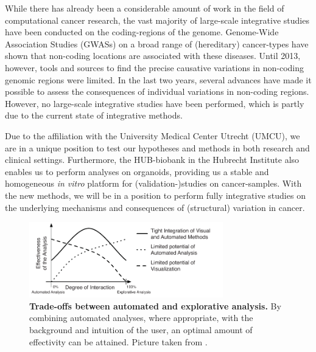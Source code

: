 \documentclass[twoside,fontsize=10pt]{article}
\begin{document}
\noindent
While there has already been a considerable amount of work in the field of computational cancer research, the vast majority of large-scale integrative studies have been conducted on the coding-regions of the genome\cite{ENCODE}. Genome-Wide Association Studies (GWASs) on a broad range of (hereditary) cancer-types have shown that non-coding locations are associated with these diseases. Until 2013, however, tools and sources to find the precise causative variations in non-coding genomic regions were limited. In the last two years, several advances have made it possible to assess the consequences of individual variations in non-coding regions\cite{Ongen2014,Khurana2013}. However, no large-scale integrative studies have been performed, which is partly due to the current state of integrative methods. 

Due to the affiliation with the University Medical Center Utrecht (UMCU), we are in a unique position to test our hypotheses and methods in both research and clinical settings. Furthermore, the HUB-biobank in the Hubrecht Institute also enables us to perform analyses on organoids, providing us a stable and homogeneous \textit{in vitro} platform for (validation-)studies on cancer-samples. With the new methods, we will be in a position to perform fully integrative studies on the underlying mechanisms and consequences of (structural) variation in cancer.
\medskip
\begin{figure}[h!]
    \centering
    \includegraphics[width=0.75\textwidth]{autoVSexplo}
    \caption{\textbf{Trade-offs between automated and explorative analysis.} By combining automated analyses, where appropriate, with the background and intuition of the user, an optimal amount of effectivity can be attained. Picture taken from \citet{Keim}.}
    \label{fig:ae}
\end{figure}
\end{document}
